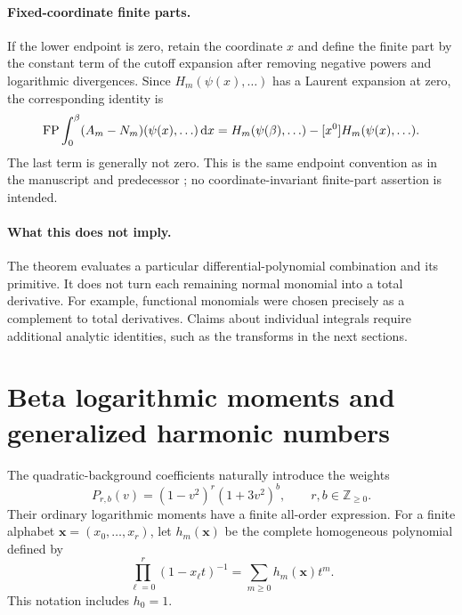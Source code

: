 \documentclass[11pt,letterpaper]{article}
\numberwithin{equation}{section}
\theoremstyle{definition}\newtheorem{definition}[theorem]{Definition}
\theoremstyle{remark}\newtheorem{remark}[theorem]{Remark}
\newcommand{\dd}{\,\mathrm d}\newcommand{\ii}{\mathrm i}
\begin{document}
\paragraph{Fixed-coordinate finite parts.}
If the lower endpoint is zero, retain the coordinate $x$ and define the
finite part by the constant term of the cutoff expansion after removing
negative powers and logarithmic divergences. Since $H_m(\psi(x),\ldots)$
has a Laurent expansion at zero, the corresponding identity is
\begin{equation}\label{ubg:eq:FP-endpoint}
 \FP\int_0^\beta(A_m-N_m)(\psi(x),\ldots)\dd x
  =H_m(\psi(\beta),\ldots)
                     -[x^0]H_m(\psi(x),\ldots).
\end{equation}
The last term is generally not zero. This is the same endpoint convention
as in the manuscript and predecessor \cite{Manuscript,Affine}; no
coordinate-invariant finite-part assertion is intended.

\paragraph{What this does not imply.}
The theorem evaluates a particular differential-polynomial combination
and its primitive. It does not turn each remaining normal monomial into
a total derivative. For example, functional monomials were chosen
precisely as a complement to total derivatives. Claims about individual
integrals require additional analytic identities, such as the transforms
in the next sections.

\section{Beta logarithmic moments and generalized harmonic numbers}
\label{ubg:sec:logmoments}

The quadratic-background coefficients naturally introduce the weights
\begin{equation}\label{ubg:eq:Prb}
 P_{r,b}(v)=(1-v^2)^r(1+3v^2)^b,
                  \qquad r,b\in\mathbb Z_{\ge0}.
\end{equation}
Their ordinary logarithmic moments have a finite all-order expression.
For a finite alphabet $\boldsymbol x=(x_0,\ldots,x_r)$, let
$h_m(\boldsymbol x)$ be the complete homogeneous polynomial defined by
\begin{equation}\label{ubg:eq:complete-homogeneous}
 \prod_{\ell=0}^r(1-x_\ell t)^{-1}
          =\sum_{m\ge0}h_m(\boldsymbol x)t^m.
\end{equation}
This notation includes $h_0=1$.
\end{document}
